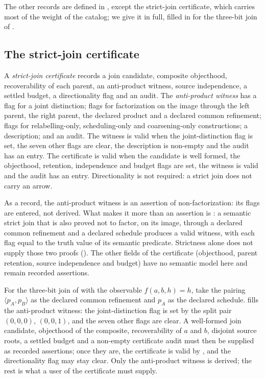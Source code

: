 The other records are defined in , except the strict-join certificate,
which carries most of the weight of the catalog; we give it in full, filled in for the three-bit
join of .

\subsection{The strict-join certificate}
\label{sec:strict-certificate}

\begin{definition}
\label{def:strict-certificate}
A \emph{strict-join certificate} records a join candidate, composite objecthood,
recoverability of each parent, an anti-product witness, source independence, a settled
budget, a directionality flag and an audit. The
\emph{anti-product witness} has a flag for a joint distinction; flags for factorization on the image
through the left parent, the right parent, the declared product and a declared common
refinement; flags for relabelling-only, scheduling-only and coarsening-only
constructions; a description; and an audit. The witness is valid when the joint-distinction
flag is set, the seven other flags are clear, the description is non-empty and the audit
has an entry. The certificate is valid when the candidate is well formed, the objecthood, retention,
independence and budget flags are set, the witness is valid and the audit has an entry.
Directionality is not required: a strict join does not carry an arrow.
\end{definition}

As a record, the anti-product witness is an assertion of non-factorization: its flags are
entered, not derived. What makes it more than an assertion is : a
semantic strict join that is also proved not to factor, on its image, through a declared
common refinement
and a declared schedule produces a valid witness, with each flag equal to the truth value
of its semantic predicate. Strictness alone does not supply those two proofs
(). The other fields of the certificate (objecthood,
parent retention, source independence and budget) have no semantic model here and remain
recorded assertions.

\begin{example}
\label{ex:cube-certificate}
For the three-bit join of  with the observable $f(a,b,h)=h$, take the pairing
$\langle p_A,p_B\rangle$ as the declared common refinement and $p_A$ as the declared schedule.
 fills the anti-product witness: the joint-distinction flag is set by the split
pair $(0,0,0)$, $(0,0,1)$, and the seven other flags are clear. A well-formed join candidate,
objecthood of the composite, recoverability of $a$ and $b$, disjoint source roots, a settled
budget and a non-empty certificate audit must then be supplied as recorded assertions; once they are, the certificate is valid by ,
and the directionality flag may stay clear. Only the anti-product witness is derived; the rest is
what a user of the certificate must supply.
\end{example}

